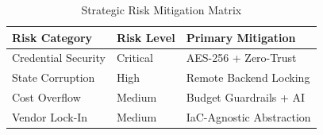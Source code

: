 \begin{table}[h]
\centering
\caption{Strategic Risk Mitigation Matrix}
\label{tab:risk_matrix}
\begin{tabular}{|l|l|l|}
\hline
\textbf{Risk Category} & \textbf{Risk Level} & \textbf{Primary Mitigation} \\ \hline
Credential Security & Critical & AES-256 + Zero-Trust \\ \hline
State Corruption & High & Remote Backend Locking \\ \hline
Cost Overflow & Medium & Budget Guardrails + AI \\ \hline
Vendor Lock-In & Medium & IaC-Agnostic Abstraction \\ \hline
\end{tabular}
\end{table}
